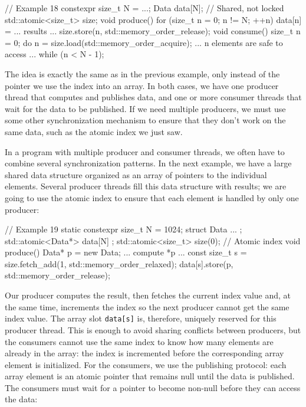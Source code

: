 \begin{code}
// Example 18
constexpr size_t N = ...;
Data data[N];     // Shared, not locked
std::atomic<size_t> size;
void produce() {
  for (size_t n = 0; n != N; ++n) {
    data[n] = ... results ...
    size.store(n, std::memory_order_release);
  }
}
void consume() {
  size_t n = 0;
  do {
    n = size.load(std::memory_order_acquire);
    ... n elements are safe to access ...
  } while (n < N - 1);
}
\end{code}

The idea is exactly the same as in the previous example, only instead of the pointer we use the index into an array. In both cases, we have one producer thread that computes and publishes data, and one or more consumer threads that wait for the data to be published. If we need multiple producers, we must use some other synchronization mechanism to ensure that they don't work on the same data, such as the atomic index we just saw.

In a program with multiple producer and consumer threads, we often have to combine several synchronization patterns. In the next example, we have a large shared data structure organized as an array of pointers to the individual elements. Several producer threads fill this data structure with results; we are going to use the atomic index to ensure that each element is handled by only one producer:

\begin{code}
// Example 19
static constexpr size_t N = 1024;
struct Data { ... };
std::atomic<Data*> data[N] {};
std::atomic<size_t> size(0);     // Atomic index
void produce() {
  Data* p = new Data;
  ... compute *p ...
  const size_t s =
    size.fetch_add(1, std::memory_order_relaxed);
  data[s].store(p, std::memory_order_release);
}
\end{code}

Our producer computes the result, then fetches the current index value and, at the same time, increments the index so the next producer cannot get the same index value. The array slot \texttt{data{[}s{]}} is, therefore, uniquely reserved for this producer thread. This is enough to avoid sharing conflicts between producers, but the consumers cannot use the same index to know how many elements are already in the array: the index is incremented before the corresponding array element is initialized. For the consumers, we use the publishing protocol: each array element is an atomic pointer that remains null until the data is published. The consumers must wait for a pointer to become non-null before they can access the data:

